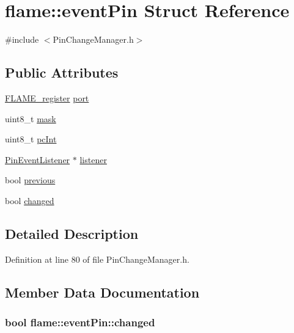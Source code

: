 \hypertarget{structflame_1_1event_pin}{\section{flame\-:\-:event\-Pin Struct Reference}
\label{structflame_1_1event_pin}
}


{\ttfamily \#include $<$Pin\-Change\-Manager.\-h$>$}

\subsection*{Public Attributes}
\begin{DoxyCompactItemize}
\item 
\hyperlink{namespaceflame_a7117d3cded694c1ded03c462d677b165}{F\-L\-A\-M\-E\-\_\-register} \hyperlink{structflame_1_1event_pin_a7bfb98722a6a21d33c3c262c6a847382}{port}
\item 
uint8\-\_\-t \hyperlink{structflame_1_1event_pin_a2b66016381933ad3285bbcec8ce36257}{mask}
\item 
uint8\-\_\-t \hyperlink{structflame_1_1event_pin_a61cbe32d1c708c62ab074935bef267ee}{pc\-Int}
\item 
\hyperlink{classflame_1_1_pin_event_listener}{Pin\-Event\-Listener} $\ast$ \hyperlink{structflame_1_1event_pin_aa38718b7fe55c65f7e2917dc0bfc2f0c}{listener}
\item 
bool \hyperlink{structflame_1_1event_pin_a2681b74d7415d069d0da214d25575fdb}{previous}
\item 
bool \hyperlink{structflame_1_1event_pin_a5e73650b961e6fc3917e29f33d8f916e}{changed}
\end{DoxyCompactItemize}


\subsection{Detailed Description}


Definition at line 80 of file Pin\-Change\-Manager.\-h.



\subsection{Member Data Documentation}
\hypertarget{structflame_1_1event_pin_a5e73650b961e6fc3917e29f33d8f916e}{
\subsubsection[{changed}]{\setlength{\rightskip}{0pt plus 5cm}bool flame\-::event\-Pin\-::changed}}\label{structflame_1_1event_pin_a5e73650b961e6fc3917e29f33d8f916e}



